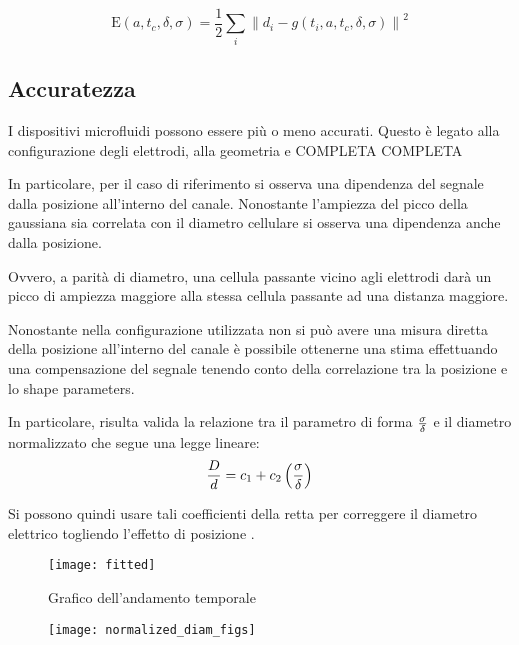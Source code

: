 \begin{equation}
	\mathrm{E}(a,t_c,\delta,\sigma) = \frac{1}{2} \sum_{i}\left\|d_{i}-g\left(t_{i},a,t_c,\delta,\sigma\right)\right\|^{2}
\end{equation}


\subsection{Accuratezza}


I dispositivi microfluidi possono essere più o meno accurati. Questo è legato alla configurazione degli elettrodi, alla geometria e COMPLETA COMPLETA

In particolare, per il caso di riferimento si osserva una dipendenza del segnale dalla posizione all'interno del canale. Nonostante l'ampiezza del picco della gaussiana sia correlata con il diametro cellulare si osserva una dipendenza anche dalla posizione.

Ovvero, a parità di diametro, una cellula passante vicino agli elettrodi darà un picco di ampiezza maggiore alla stessa cellula passante ad una distanza maggiore.

Nonostante nella configurazione utilizzata non si può avere una misura diretta della posizione all'interno del canale è possibile ottenerne una stima effettuando una compensazione del segnale tenendo conto della correlazione tra la posizione e lo shape parameters.

In particolare, risulta valida la relazione tra il parametro di forma $\sigma \over \delta$ e il diametro normalizzato che segue una legge lineare:
\begin{equation}
	{D\over d}={c_1+c_2\left(\sigma \over \delta \right)}
\end{equation}

Si possono quindi usare tali coefficienti della retta per correggere il diametro elettrico togliendo l'effetto di posizione \cite{errico_mitigating_2017}.



\begin{figure}[t!]
	\centering
	\texttt{[image: fitted]}
	\caption{Grafico dell'andamento temporale }
	\label{fig:fitted}
\end{figure}


\begin{figure}[t!]
	\centering
	\texttt{[image: normalized\_diam\_figs]}
	\caption{}
	\label{fig:normalized}
\end{figure}

